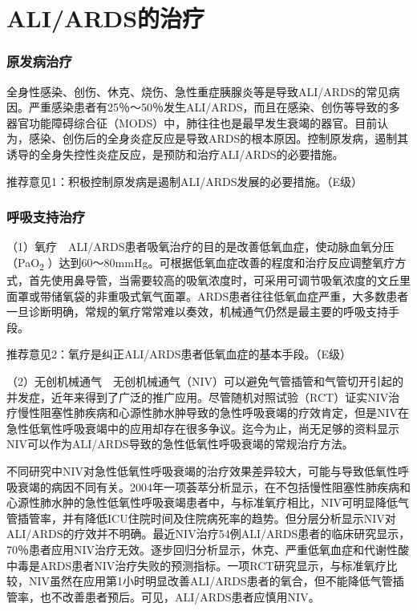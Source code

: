 \section{ALI/ARDS的治疗}

\subsubsection{原发病治疗}

全身性感染、创伤、休克、烧伤、急性重症胰腺炎等是导致ALI/ARDS的常见病因。严重感染患者有25％～50％发生ALI/ARDS，而且在感染、创伤等导致的多器官功能障碍综合征（MODS）中，肺往往也是最早发生衰竭的器官。目前认为，感染、创伤后的全身炎症反应是导致ARDS的根本原因。控制原发病，遏制其诱导的全身失控性炎症反应，是预防和治疗ALI/ARDS的必要措施。

推荐意见1：积极控制原发病是遏制ALI/ARDS发展的必要措施。（E级）

\subsubsection{呼吸支持治疗}

（1）氧疗　ALI/ARDS患者吸氧治疗的目的是改善低氧血症，使动脉血氧分压（PaO\textsubscript{2}
）达到60～80mmHg。可根据低氧血症改善的程度和治疗反应调整氧疗方式，首先使用鼻导管，当需要较高的吸氧浓度时，可采用可调节吸氧浓度的文丘里面罩或带储氧袋的非重吸式氧气面罩。ARDS患者往往低氧血症严重，大多数患者一旦诊断明确，常规的氧疗常常难以奏效，机械通气仍然是最主要的呼吸支持手段。

推荐意见2：氧疗是纠正ALI/ARDS患者低氧血症的基本手段。（E级）

（2）无创机械通气　无创机械通气（NIV）可以避免气管插管和气管切开引起的并发症，近年来得到了广泛的推广应用。尽管随机对照试验（RCT）证实NIV治疗慢性阻塞性肺疾病和心源性肺水肿导致的急性呼吸衰竭的疗效肯定，但是NIV在急性低氧性呼吸衰竭中的应用却存在很多争议。迄今为止，尚无足够的资料显示NIV可以作为ALI/ARDS导致的急性低氧性呼吸衰竭的常规治疗方法。

不同研究中NIV对急性低氧性呼吸衰竭的治疗效果差异较大，可能与导致低氧性呼吸衰竭的病因不同有关。2004年一项荟萃分析显示，在不包括慢性阻塞性肺疾病和心源性肺水肿的急性低氧性呼吸衰竭患者中，与标准氧疗相比，NIV可明显降低气管插管率，并有降低ICU住院时间及住院病死率的趋势。但分层分析显示NIV对ALI/ARDS的疗效并不明确。最近NIV治疗54例ALI/ARDS患者的临床研究显示，70％患者应用NIV治疗无效。逐步回归分析显示，休克、严重低氧血症和代谢性酸中毒是ARDS患者NIV治疗失败的预测指标。一项RCT研究显示，与标准氧疗比较，NIV虽然在应用第1小时明显改善ALI/ARDS患者的氧合，但不能降低气管插管率，也不改善患者预后。可见，ALI/ARDS患者应慎用NIV。

